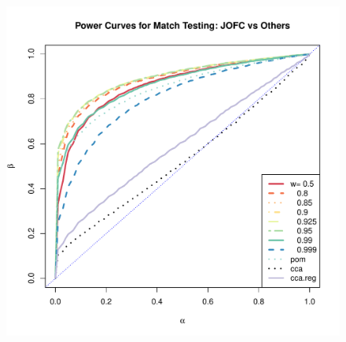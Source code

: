 \documentclass[11pt]{article} %
\begin{document}
\begin{figure}
\includegraphics{MVN_JOFC_q_90_c_0_001}
\caption{}
\label{fig:largeq}
\end{figure}
\end{document}
